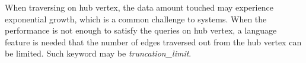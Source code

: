 
When traversing on hub vertex, the data amount touched may experience
exponential growth, which is a common challenge to systems. When the performance
is not enough to satisfy the queries on hub vertex, a language feature is needed
that the number of edges traversed out from the hub vertex can be limited. Such
keyword may be \emph{truncation\_limit}.



